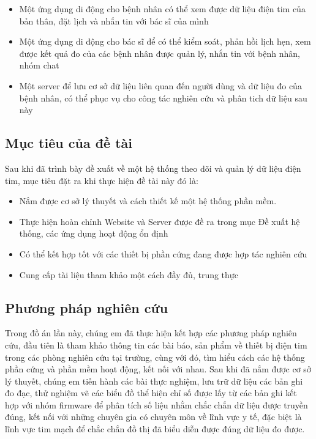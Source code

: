 \begin{adjustwidth}{1.5em}{}
  \begin{itemize}
     
      \item Một ứng dụng di động cho bệnh nhân có thể xem được dữ liệu điện tim của bản thân, đặt lịch và nhắn tin với bác sĩ của mình
      \item Một ứng dụng di động cho bác sĩ để có thể kiểm soát, phản hồi lịch hẹn, xem được kết quả đo của các bệnh nhân được quản lý, nhắn tin với bệnh nhân, nhóm chat
      \item Một server để lưu cơ sở dữ liệu liên quan đến người dùng và dữ liệu đo của bệnh nhân, có thể phục vụ cho công tác nghiên cứu và phân tich dữ liệu sau này

  \end{itemize}
  \end{adjustwidth}


\subsection*{Mục tiêu của đề tài}
Sau khi đã trình bày đề xuất về một hệ thống theo dõi và quản lý dữ liệu điện tim, mục tiêu đặt ra khi thực hiện
đề tài này đó là:

\begin{adjustwidth}{1.5em}{}
  \begin{itemize}
      \item Nắm được cơ sở lý thuyết và cách thiết kế một hệ thống phần mềm.
      \item Thực hiện hoàn chỉnh Website và Server được đề ra trong mục Đề xuất hệ thống, các ứng dụng hoạt động ổn định
      \item Có thể kết hợp tốt với các thiết bị phần cứng đang được hợp tác nghiên cứu
      \item Cung cấp tài liệu tham khảo một cách đầy đủ, trung thực

  \end{itemize}
  \end{adjustwidth}





\subsection*{Phương pháp nghiên cứu}
Trong đồ án lần này, chúng em đã thực hiện kết hợp các phương pháp nghiên cứu, đầu tiên là tham khảo thông tin các bài
báo, sản phẩm về thiết bị điện tim trong các phòng nghiên cứu tại trường, cùng với đó, tìm hiểu cách các hệ thống phần cứng và phần mềm hoạt động,
kết nối với nhau. Sau khi đã nắm được cơ sở lý thuyết, chúng em tiến hành các bài thực nghiệm, lưu trữ dữ liệu các bản ghi đo đạc, thử nghiệm vẽ các biểu đồ thể hiện chỉ số được lấy từ các bản ghi
kết hợp với nhóm firmware để phân tích số liệu nhằm chắc chắn dữ liệu được truyền đúng, kết nối với những chuyên gia có chuyên môn về lĩnh vực y tế, đặc biệt là lĩnh vực tim mạch để chắc chắn đồ thị đã biểu diễn được đúng dữ liệu đo được.

